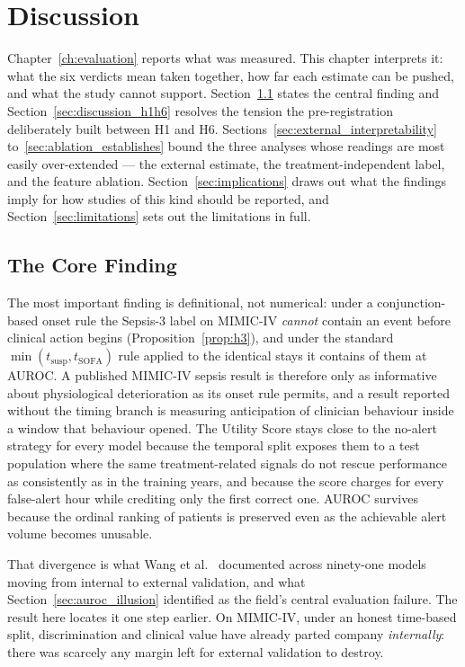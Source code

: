\chapter{Discussion}
\label{ch:discussion}

Chapter~\ref{ch:evaluation} reports what was measured. This chapter interprets
it: what the six verdicts mean taken together, how far each estimate can be
pushed, and what the study cannot support. Section~\ref{sec:discussion_core}
states the central finding and Section~\ref{sec:discussion_h1h6} resolves the
tension the pre-registration deliberately built between H1 and H6.
Sections~\ref{sec:external_interpretability} to~\ref{sec:ablation_establishes}
bound the three analyses whose readings are most easily over-extended --- the
external estimate, the treatment-independent label, and the feature ablation.
Section~\ref{sec:implications} draws out what the findings imply for how
studies of this kind should be reported, and
Section~\ref{sec:limitations} sets out the limitations in full.


\section{The Core Finding}
\label{sec:discussion_core}

The most important finding is definitional, not numerical: under a
conjunction-based onset rule the Sepsis-3 label on MIMIC-IV \emph{cannot}
contain an event before clinical action begins (Proposition~\ref{prop:h3}), and
under the standard $\min(t_{\text{susp}}, t_{\text{SOFA}})$ rule applied to the
identical stays it contains \pcPreTreatOnsetsVarF{} of them at
\pcPreTreatAurocPrimaryF{} AUROC. A published MIMIC-IV sepsis result is
therefore only as informative about physiological deterioration as its onset
rule permits, and a result reported without the timing branch is measuring
anticipation of clinician behaviour inside a window that behaviour opened.
The Utility Score stays close to the no-alert strategy for every model because
the temporal split exposes them to a test population where the same
treatment-related signals do not rescue performance as consistently as in the
training years, and because the score charges for every false-alert hour while
crediting only the first correct one. AUROC survives because the ordinal
ranking of patients is preserved even as the achievable alert volume becomes
unusable.

That divergence is what Wang et al.\ \cite{wang2025srpm} documented across
ninety-one models moving from internal to external validation, and what
Section~\ref{sec:auroc_illusion} identified as the field's central evaluation
failure. The result here locates it one step earlier. On MIMIC-IV, under an
honest time-based split, discrimination and clinical value have already parted
company \emph{internally}: there was scarcely any margin left for external
validation to destroy.


